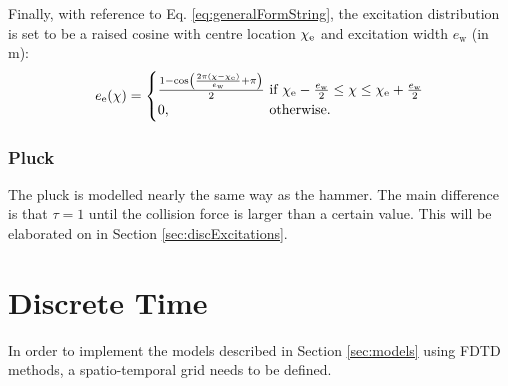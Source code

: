 \documentclass{article}
\begin{document}
Finally, with reference to Eq. \eqref{eq:generalFormString}, the excitation distribution is set to be a raised cosine with centre location $\chi_{\text{e}}$ and excitation width $e_\text{w}$ (in m):
\begin{equation}
    e_\etxt(\chi) = \begin{cases}
        \frac{1 - \cos\left(\frac{2\pi (\chi - \chi_\etxt)}{e_\text{w}} + \pi\right)}{2}&\!\!\!\!\text{if}\ \chi_\etxt - \frac{e_\text{w}}{2}\leq \chi \leq \chi_\etxt + \frac{e_\text{w}}{2}\\
        0,& \!\!\!\!\text{otherwise.}
        \end{cases}
\end{equation}
\subsubsection{Pluck}
The pluck is modelled nearly the same way as the hammer. The main difference is that $\tau = 1$ until the collision force is larger than a certain value. This will be elaborated on in Section \ref{sec:discExcitations}.

\section{Discrete Time}

In order to implement the models described in Section \ref{sec:models} using FDTD methods, a spatio-temporal grid needs to be defined.

\end{document}
